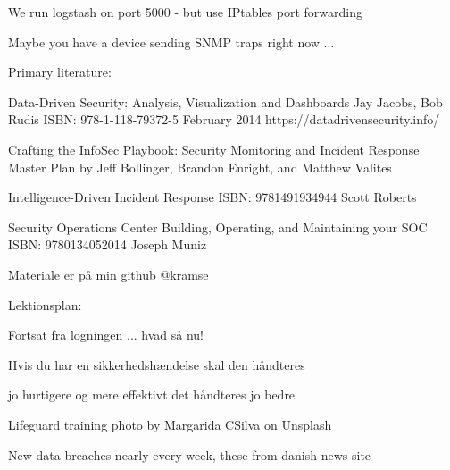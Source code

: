 \documentclass[Screen16to9,17pt]{foils}
\begin{document}
\begin{list2}
\item We run logstash on port 5000 - but use IPtables port forwarding
\end{list2}

Maybe you have a device sending SNMP traps right now ...



Primary literature:
\begin{list2}
\item Data-Driven Security: Analysis, Visualization and Dashboards Jay Jacobs, Bob Rudis ISBN: 978-1-118-79372-5 February 2014 https://datadrivensecurity.info/
\item Crafting the InfoSec Playbook: Security Monitoring and Incident Response Master Plan by Jeff Bollinger, Brandon Enright, and Matthew Valites
\item Intelligence-Driven Incident Response ISBN: 9781491934944 Scott Roberts
\item Security Operations Center Building, Operating, and Maintaining your SOC ISBN: 9780134052014 Joseph Muniz
\end{list2}

{\footnotesize
Materiale er på min github @kramse

Lektionsplan:\\
}





\begin{list2}
\item Fortsat fra logningen ... hvad så nu!
\item Hvis du har en sikkerhedshændelse skal den håndteres
\item jo hurtigere og mere effektivt det håndteres jo bedre
\end{list2}

Lifeguard training photo by Margarida CSilva on Unsplash



New data breaches nearly every week, these from danish news site 
\end{document}
